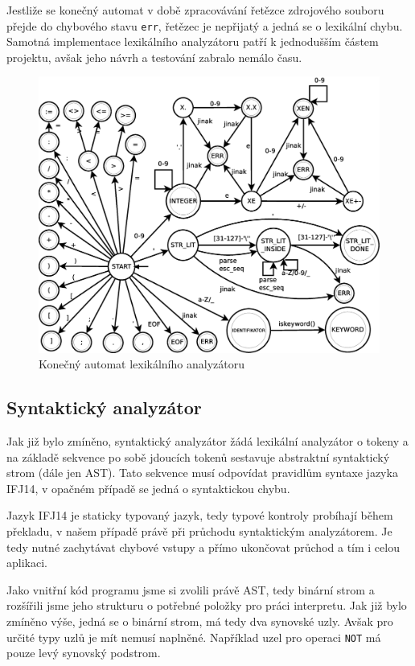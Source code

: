 \documentclass[12pt,a4paper,titlepage,final]{article}
\begin{document}
Jestliže se konečný automat v době zpracovávání řetězce zdrojového souboru
přejde do chybového stavu \verb|err|, řetězec je nepřijatý a jedná se
o lexikální chybu. Samotná implementace lexikálního analyzátoru patří k
jednodušším částem projektu, avšak jeho návrh a testování zabralo nemálo času.

\begin{figure}[h!]\label{lex_ka}
	\centering
		\includegraphics[width=\textwidth]{img/KA-scanner.eps}
	\caption{Konečný automat lexikálního analyzátoru}
\end{figure}
\pagebreak

\subsection{Syntaktický analyzátor} \label{syntakticky_analyzator}
Jak již bylo zmíněno, syntaktický analyzátor žádá lexikální analyzátor o tokeny
a na základě sekvence po sobě jdoucích tokenů sestavuje abstraktní syntaktický
strom (dále jen AST). Tato sekvence musí odpovídat pravidlům syntaxe jazyka IFJ14,
v opačném případě se jedná o syntaktickou chybu.

Jazyk IFJ14 je staticky typovaný jazyk, tedy typové kontroly probíhají během 
překladu, v našem případě právě při průchodu syntaktickým analyzátorem. Je tedy
nutné zachytávat chybové vstupy a přímo ukončovat průchod a tím i celou aplikaci.

Jako vnitřní kód programu jsme si zvolili právě AST, tedy binární strom a rozšířili jsme
jeho strukturu o potřebné položky pro práci interpretu. Jak již bylo zmíněno výše,
jedná se o binární strom, má tedy dva synovské uzly. Avšak pro určité typy uzlů
je mít nemusí naplněné. Například uzel pro operaci \verb|NOT| má pouze levý synovský podstrom.
\end{document}
